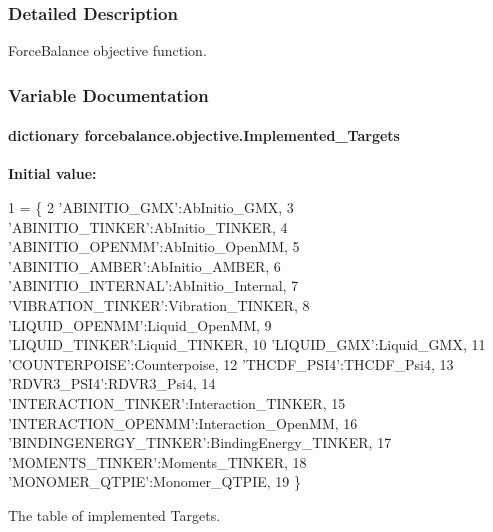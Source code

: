 \subsubsection{Detailed Description}
Force\-Balance objective function. 

\subsubsection{Variable Documentation}
\hypertarget{namespaceforcebalance_1_1objective_a8c93e21f995ed17addb493ec94368ab5}{
\paragraph[{Implemented\-\_\-\-Targets}]{\setlength{\rightskip}{0pt plus 5cm}dictionary forcebalance.\-objective.\-Implemented\-\_\-\-Targets}}\label{namespaceforcebalance_1_1objective_a8c93e21f995ed17addb493ec94368ab5}
{\bfseries Initial value\-:}
\begin{DoxyCode}
1 = \{
2     \textcolor{stringliteral}{'ABINITIO\_GMX'}:AbInitio\_GMX,
3     \textcolor{stringliteral}{'ABINITIO\_TINKER'}:AbInitio\_TINKER,
4     \textcolor{stringliteral}{'ABINITIO\_OPENMM'}:AbInitio\_OpenMM,
5     \textcolor{stringliteral}{'ABINITIO\_AMBER'}:AbInitio\_AMBER,
6     \textcolor{stringliteral}{'ABINITIO\_INTERNAL'}:AbInitio\_Internal,
7     \textcolor{stringliteral}{'VIBRATION\_TINKER'}:Vibration\_TINKER,
8     \textcolor{stringliteral}{'LIQUID\_OPENMM'}:Liquid\_OpenMM,
9     \textcolor{stringliteral}{'LIQUID\_TINKER'}:Liquid\_TINKER, 
10     \textcolor{stringliteral}{'LIQUID\_GMX'}:Liquid\_GMX, 
11     \textcolor{stringliteral}{'COUNTERPOISE'}:Counterpoise,
12     \textcolor{stringliteral}{'THCDF\_PSI4'}:THCDF\_Psi4,
13     \textcolor{stringliteral}{'RDVR3\_PSI4'}:RDVR3\_Psi4,
14     \textcolor{stringliteral}{'INTERACTION\_TINKER'}:Interaction\_TINKER,
15     \textcolor{stringliteral}{'INTERACTION\_OPENMM'}:Interaction\_OpenMM,
16     \textcolor{stringliteral}{'BINDINGENERGY\_TINKER'}:BindingEnergy\_TINKER,
17     \textcolor{stringliteral}{'MOMENTS\_TINKER'}:Moments\_TINKER,
18     \textcolor{stringliteral}{'MONOMER\_QTPIE'}:Monomer\_QTPIE,
19     \}
\end{DoxyCode}


The table of implemented Targets. 



